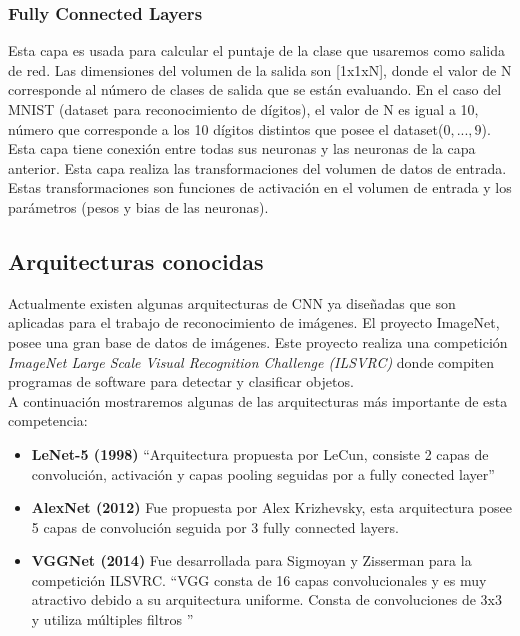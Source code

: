 \subsubsection{Fully Connected Layers}

Esta capa es usada para calcular el puntaje de la clase que usaremos como salida de red. Las dimensiones del volumen de la salida son [1x1xN], donde el valor de N corresponde al número de clases de salida que se están evaluando. En el caso del MNIST (dataset para reconocimiento de dígitos), el valor de N es igual a 10, número que corresponde a los 10 dígitos distintos que posee el dataset($0, ... ,9$).\\
Esta capa tiene conexión entre todas sus neuronas y las neuronas de la capa anterior. Esta capa realiza las transformaciones del volumen de datos de entrada. Estas transformaciones son funciones de activación en el volumen de entrada y los parámetros (pesos y bias de las neuronas).
\subsection{Arquitecturas conocidas}
Actualmente existen algunas arquitecturas de CNN ya diseñadas que son aplicadas para el trabajo de reconocimiento de imágenes. El proyecto ImageNet, posee una gran base de datos de imágenes. Este proyecto realiza una competición \textit{ImageNet Large Scale Visual Recognition Challenge (ILSVRC) } donde compiten programas de software para detectar y clasificar objetos.\\ A continuación mostraremos algunas de las arquitecturas más importante de esta competencia:

\begin{itemize}
	\item \textbf{LeNet-5 (1998)} \textquotedblleft Arquitectura propuesta por LeCun, consiste 2 capas de convolución, activación  y capas pooling seguidas por a fully conected layer\textquotedblright \cite{WEBSITE:9}
	\item \textbf{AlexNet (2012)} Fue propuesta por Alex Krizhevsky, esta arquitectura posee 5 capas de convolución seguida por 3 fully connected layers.
	\item \textbf{VGGNet (2014)} Fue desarrollada para Sigmoyan y Zisserman para la competición ILSVRC. \textquotedblleft VGG consta de 16 capas convolucionales y es muy atractivo debido a su arquitectura uniforme. Consta de convoluciones de 3x3 y utiliza múltiples filtros \textquotedblright \cite{WEBSITE:10}	
\end{itemize}
